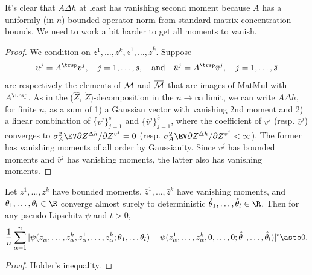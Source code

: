 \documentclass[main.tex]{subfiles}
\begin{document}
It's clear that $A\Delta h$ at least has vanishing second moment because $A$ has a uniformly (in $n$) bounded operator norm from standard matrix concentration bounds. We need to work a bit harder to get all moments to vanish.
\begin{proof}
We condition on $z^{1},\ldots,z^{k},\bar{z}^{1},\ldots,\bar{z}^{\bar{k}}$. Suppose
\[
u^{j}=A^{\trsp}v^{j},\quad j=1,\ldots,s,\quad\text{and}\quad\bar{u}^{j}=A^{\trsp}\bar{v}^{j},\quad j=1,\ldots,\bar{s}
\]
are respectively the elements of $\mathcal{M}$ and $\overline{\mathcal{M}}$ that are images of MatMul with $A^{\trsp}$. As in the ($\hat{Z}$, $\dot{Z}$)-decomposition in the $n\to\infty$ limit, we can write $A\Delta h$, for finite $n$, as a sum of 1) a Gaussian vector with vanishing 2nd moment and 2) a linear combination of \{$v^{j}\}_{j=1}^{s}$ and $\{\bar{v}^{j}\}_{j=1}^{\bar{s}}$, where the coefficient of $v^{j}$ (resp. $\bar{v}^{j}$) converges to $\sigma_{A}^{2}\EV\partial Z^{\Delta h}/\partial Z^{v^{j}}=0$ (resp. $\sigma_{A}^{2}\EV\partial Z^{\Delta h}/\partial Z^{\bar{v}^{j}}<\infty$). The former has vanishing moments of all order by Gaussianity. Since $v^{j}$ has bounded moments and $\bar{v}^{j}$ has vanishing moments, the latter also has vanishing moments.
\end{proof}
\begin{lemma}
\label{lemma:removeVanishing}Let $z^{1},\ldots,z^{k}$ have bounded moments, $\bar{z}^{1},\ldots,\bar{z}^{\bar{k}}$ have vanishing moments, and $\theta_{1},\ldots,\theta_{l}\in\R$ converge almost surely to deterministic $\mathring{\theta}_{1},\ldots,\mathring{\theta}_{l}\in\R$. Then for any pseudo-Lipschitz $\psi$ and $t>0$,
\[
\frac{1}{n}\sum_{\alpha=1}^{n}|\psi(z_{\alpha}^{1},\ldots,z_{\alpha}^{k},\bar{z}_{\alpha}^{1},\ldots,\bar{z}_{\alpha}^{\bar{k}};\theta_{1},\ldots\theta_{l})-\psi(z_{\alpha}^{1},\ldots,z_{\alpha}^{k},0,\ldots,0;\mathring{\theta}_{1},\ldots,\mathring{\theta}_{l})|^t \asto0.
\]
\end{lemma}
\begin{proof}
  Holder's inequality.
\end{proof}
\end{document}
